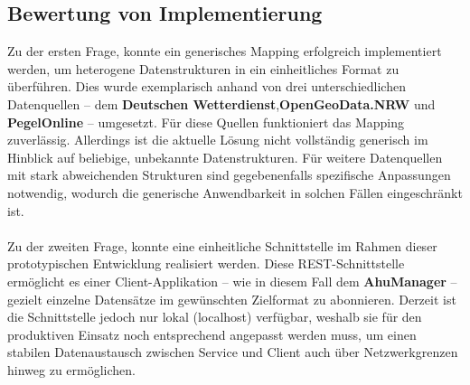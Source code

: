 \documentclass[a4paper,12pt]{scrreprt}
\begin{document}
\subsection{Bewertung von Implementierung}
Zu der ersten Frage, konnte ein generisches Mapping  erfolgreich implementiert werden, um heterogene Datenstrukturen in ein einheitliches Format zu überführen. Dies wurde exemplarisch anhand von drei unterschiedlichen Datenquellen – dem \textbf{Deutschen Wetterdienst},\textbf{OpenGeoData.NRW} und \textbf{PegelOnline} – umgesetzt. Für diese Quellen funktioniert das Mapping zuverlässig. Allerdings ist die aktuelle Lösung nicht vollständig generisch im Hinblick auf beliebige, unbekannte Datenstrukturen. Für weitere Datenquellen mit stark abweichenden Strukturen sind gegebenenfalls spezifische Anpassungen notwendig, wodurch die generische Anwendbarkeit in solchen Fällen eingeschränkt ist.\\ \\
Zu der zweiten Frage, konnte eine einheitliche Schnittstelle im Rahmen dieser prototypischen Entwicklung realisiert werden. Diese REST-Schnittstelle ermöglicht es einer Client-Applikation – wie in diesem Fall dem \textbf{AhuManager} – gezielt einzelne Datensätze im gewünschten Zielformat zu abonnieren. Derzeit ist die Schnittstelle jedoch nur lokal (localhost) verfügbar, weshalb sie für den produktiven Einsatz noch entsprechend angepasst werden muss, um einen stabilen Datenaustausch zwischen Service und Client auch über Netzwerkgrenzen hinweg zu ermöglichen.
\end{document}
